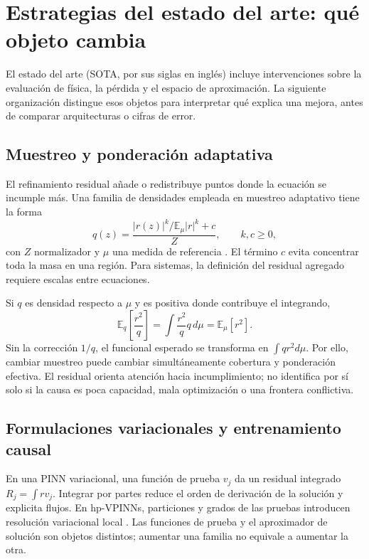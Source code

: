 \section{Estrategias del estado del arte: qué objeto cambia}
El estado del arte (SOTA, por sus siglas en inglés) incluye intervenciones sobre la evaluación de física, la pérdida y el espacio de aproximación. La siguiente organización distingue esos objetos para interpretar qué explica una mejora, antes de comparar arquitecturas o cifras de error.
\subsection{Muestreo y ponderación adaptativa}
El refinamiento residual añade o redistribuye puntos donde la ecuación se incumple más. Una familia de densidades empleada en muestreo adaptativo tiene la forma
\begin{equation}
q(z)=\frac{|r(z)|^k/\mathbb E_\mu|r|^k+c}{Z},\qquad k,c\geq0,
\label{eq:rad}
\end{equation}
con $Z$ normalizador y $\mu$ una medida de referencia \cite{wu2023sampling}. El término $c$ evita concentrar toda la masa en una región. Para sistemas, la definición del residual agregado requiere escalas entre ecuaciones.

Si $q$ es densidad respecto a $\mu$ y es positiva donde contribuye el integrando,
\begin{equation}
\mathbb E_q\left[\frac{r^2}{q}\right]=\int\frac{r^2}{q}q\,d\mu=\mathbb E_\mu[r^2].
\end{equation}
Sin la corrección $1/q$, el funcional esperado se transforma en $\int q r^2d\mu$. Por ello, cambiar muestreo puede cambiar simultáneamente cobertura y ponderación efectiva. El residual orienta atención hacia incumplimiento; no identifica por sí solo si la causa es poca capacidad, mala optimización o una frontera conflictiva.

\subsection{Formulaciones variacionales y entrenamiento causal}
En una PINN variacional, una función de prueba $v_j$ da un residual integrado $R_j=\int r v_j$. Integrar por partes reduce el orden de derivación de la solución y explicita flujos. En hp-VPINNs, particiones y grados de las pruebas introducen resolución variacional local \cite{kharazmi2021hpvpinns}. Las funciones de prueba y el aproximador de solución son objetos distintos; aumentar una familia no equivale a aumentar la otra.

